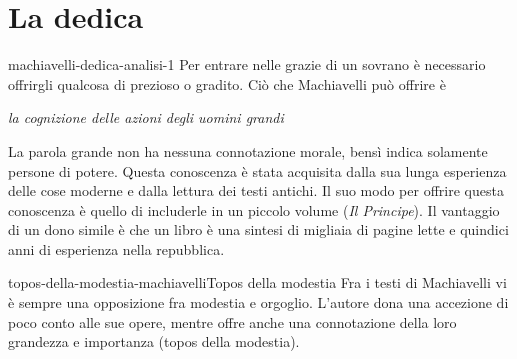 \documentclass[preview]{standalone}
\begin{document}
\genpage

\section{La dedica}

\begin{snippet}{machiavelli-dedica-analisi-1}
    Per entrare nelle grazie di un sovrano è necessario offrirgli qualcosa di prezioso o gradito.
    Ciò che Machiavelli può offrire è
    \begin{center}
        \textit{la cognizione delle azioni degli uomini grandi}
    \end{center}
    La parola grande non ha nessuna connotazione morale, bensì indica solamente
    persone di potere.
    Questa conoscenza è stata acquisita dalla sua lunga esperienza delle cose moderne
    e dalla lettura dei testi antichi.
    Il suo modo per offrire questa conoscenza è quello di includerle in un piccolo volume (\textit{Il Principe}).
    Il vantaggio di un dono simile è che un libro è una sintesi di migliaia di pagine
    lette e quindici anni di esperienza nella repubblica.
\end{snippet}

\begin{snippetnote}{topos-della-modestia-machiavelli}{Topos della modestia}
    Fra i testi di Machiavelli vi è sempre una opposizione fra modestia e orgoglio.
    L'autore dona una accezione di poco conto alle sue opere, mentre
    offre anche una connotazione della loro grandezza e importanza (topos della modestia).
\end{snippetnote}
\end{document}
